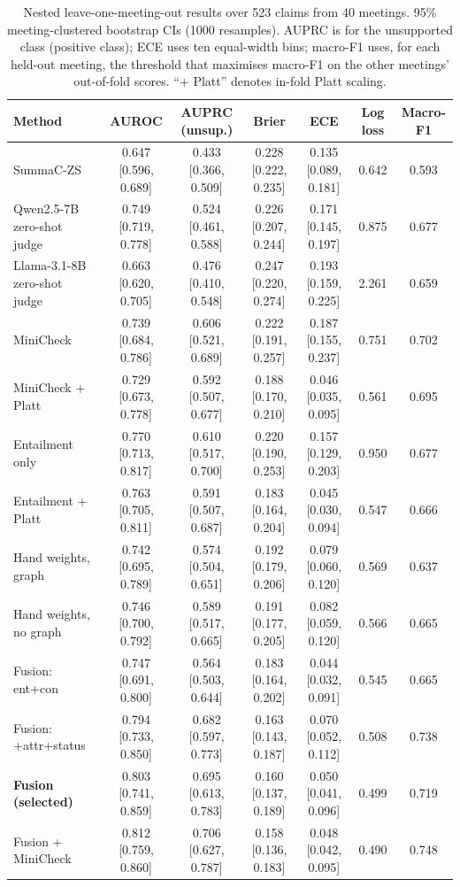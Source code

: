 \begin{table}[htbp]
\centering
\caption{Nested leave-one-meeting-out results over 523 claims from 40 meetings. 95\% meeting-clustered bootstrap CIs (1000 resamples). AUPRC is for the unsupported class (positive class); ECE uses ten equal-width bins; macro-F1 uses, for each held-out meeting, the threshold that maximises macro-F1 on the other meetings' out-of-fold scores. ``+ Platt'' denotes in-fold Platt scaling.}
\label{tab:main}
\scriptsize
\begin{tabular}{@{}lcccccc@{}}
\toprule
Method & AUROC & AUPRC (unsup.) & Brier & ECE & Log loss & Macro-F1 \\
\midrule
SummaC-ZS & 0.647 [0.596, 0.689] & 0.433 [0.366, 0.509] & 0.228 [0.222, 0.235] & 0.135 [0.089, 0.181] & 0.642 & 0.593 \\
Qwen2.5-7B zero-shot judge & 0.749 [0.719, 0.778] & 0.524 [0.461, 0.588] & 0.226 [0.207, 0.244] & 0.171 [0.145, 0.197] & 0.875 & 0.677 \\
Llama-3.1-8B zero-shot judge & 0.663 [0.620, 0.705] & 0.476 [0.410, 0.548] & 0.247 [0.220, 0.274] & 0.193 [0.159, 0.225] & 2.261 & 0.659 \\
MiniCheck & 0.739 [0.684, 0.786] & 0.606 [0.521, 0.689] & 0.222 [0.191, 0.257] & 0.187 [0.155, 0.237] & 0.751 & 0.702 \\
MiniCheck + Platt & 0.729 [0.673, 0.778] & 0.592 [0.507, 0.677] & 0.188 [0.170, 0.210] & 0.046 [0.035, 0.095] & 0.561 & 0.695 \\
Entailment only & 0.770 [0.713, 0.817] & 0.610 [0.517, 0.700] & 0.220 [0.190, 0.253] & 0.157 [0.129, 0.203] & 0.950 & 0.677 \\
Entailment + Platt & 0.763 [0.705, 0.811] & 0.591 [0.507, 0.687] & 0.183 [0.164, 0.204] & 0.045 [0.030, 0.094] & 0.547 & 0.666 \\
Hand weights, graph & 0.742 [0.695, 0.789] & 0.574 [0.504, 0.651] & 0.192 [0.179, 0.206] & 0.079 [0.060, 0.120] & 0.569 & 0.637 \\
Hand weights, no graph & 0.746 [0.700, 0.792] & 0.589 [0.517, 0.665] & 0.191 [0.177, 0.205] & 0.082 [0.059, 0.120] & 0.566 & 0.665 \\
Fusion: ent+con & 0.747 [0.691, 0.800] & 0.564 [0.503, 0.644] & 0.183 [0.164, 0.202] & 0.044 [0.032, 0.091] & 0.545 & 0.665 \\
Fusion: +attr+status & 0.794 [0.733, 0.850] & 0.682 [0.597, 0.773] & 0.163 [0.143, 0.187] & 0.070 [0.052, 0.112] & 0.508 & 0.738 \\
\textbf{Fusion (selected)} & 0.803 [0.741, 0.859] & 0.695 [0.613, 0.783] & 0.160 [0.137, 0.189] & 0.050 [0.041, 0.096] & 0.499 & 0.719 \\
Fusion + MiniCheck & 0.812 [0.759, 0.860] & 0.706 [0.627, 0.787] & 0.158 [0.136, 0.183] & 0.048 [0.042, 0.095] & 0.490 & 0.748 \\
\bottomrule
\end{tabular}
\end{table}